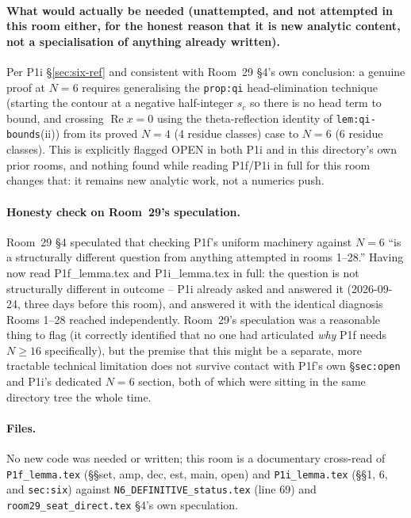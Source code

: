 \documentclass[11pt]{article}
\begin{document}
\paragraph{What would actually be needed (unattempted, and not attempted in this room either, for
the honest reason that it is new analytic content, not a specialisation of anything already
written).} Per P1i \S\ref{sec:six-ref} and consistent with Room~29 \S4's own conclusion: a genuine
proof at $N=6$ requires generalising the \texttt{prop:qi} head-elimination technique (starting the
contour at a negative half-integer $s_c$ so there is no head term to bound, and crossing
$\operatorname{Re}x=0$ using the theta-reflection identity of \texttt{lem:qi-bounds}(ii)) from its
proved $N=4$ (4 residue classes) case to $N=6$ (6 residue classes). This is explicitly flagged OPEN
in both P1i and in this directory's own prior rooms, and nothing found while reading P1f/P1i in full
for this room changes that: it remains new analytic work, not a numerics push.

\paragraph{Honesty check on Room~29's speculation.} Room~29 \S4 speculated that checking P1f's
uniform machinery against $N=6$ ``is a structurally different question from anything attempted in
rooms 1--28.'' Having now read P1f\_lemma.tex and P1i\_lemma.tex in full: the question is not
structurally different in outcome -- P1i already asked and answered it (2026-09-24, three days
before this room), and answered it with the identical diagnosis Rooms 1--28 reached independently.
Room~29's speculation was a reasonable thing to flag (it correctly identified that no one had
articulated \emph{why} P1f needs $N\ge16$ specifically), but the premise that this might be a
separate, more tractable technical limitation does not survive contact with P1f's own
\S\texttt{sec:open} and P1i's dedicated $N=6$ section, both of which were sitting in the same
directory tree the whole time.

\paragraph{Files.} No new code was needed or written; this room is a documentary cross-read of
\texttt{P1f\_lemma.tex} (\S\S set, amp, dec, est, main, open) and \texttt{P1i\_lemma.tex} (\S\S 1,
6, and \texttt{sec:six}) against \texttt{N6\_DEFINITIVE\_status.tex} (line 69) and
\texttt{room29\_seat\_direct.tex} \S4's own speculation.
\end{document}

